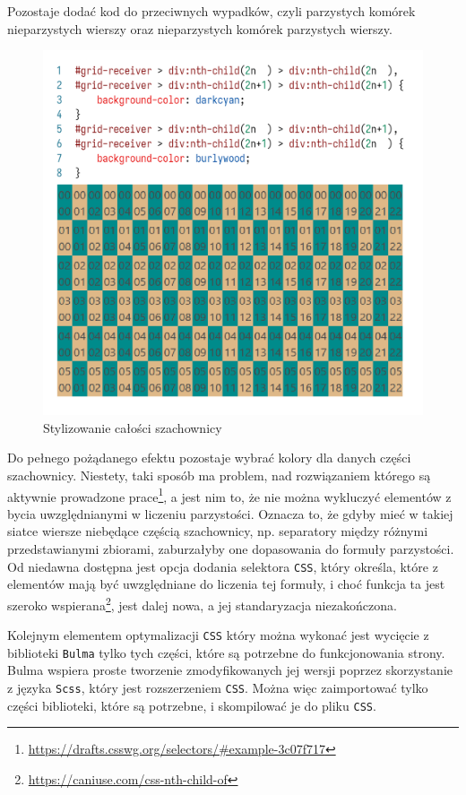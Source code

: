 \documentclass[licencjacka]{pracadypl}
\begin{document}
Pozostaje dodać kod do przeciwnych wypadków, czyli parzystych komórek nieparzystych wierszy oraz nieparzystych komórek parzystych wierszy.

\begin{figure}[H]
  \centering
  \includegraphics[width=\linewidth/\real{2}]{images/codeui-checkerboard-coloring.png}
  \caption{Stylizowanie całości szachownicy}
  \label{fig:codeui-checkerboard-coloring}
\end{figure}

Do pełnego pożądanego efektu pozostaje wybrać kolory dla danych części szachownicy. Niestety, taki sposób ma problem, nad rozwiązaniem którego są aktywnie prowadzone prace\footnote{\url{https://drafts.csswg.org/selectors/\#example-3c07f717}}, a jest nim to, że nie można wykluczyć elementów z bycia uwzględnianymi w liczeniu parzystości. Oznacza to, że gdyby mieć w takiej siatce wiersze niebędące częścią szachownicy, np. separatory między różnymi przedstawianymi zbiorami, zaburzałyby one dopasowania do formuły parzystości. Od niedawna dostępna jest opcja dodania selektora \texttt{CSS}, który określa, które z elementów mają być uwzględniane do liczenia tej formuły, i choć funkcja ta jest szeroko wspierana\footnote{\url{https://caniuse.com/css-nth-child-of}}, jest dalej nowa, a jej standaryzacja niezakończona.

Kolejnym elementem optymalizacji \texttt{CSS} który można wykonać jest wycięcie z biblioteki \texttt{Bulma} tylko tych części, które są potrzebne do funkcjonowania strony. Bulma wspiera proste tworzenie zmodyfikowanych jej wersji poprzez skorzystanie z języka \texttt{Scss}, który jest rozszerzeniem \texttt{CSS}. Można więc zaimportować tylko części biblioteki, które są potrzebne, \linebreak i skompilować je do pliku \texttt{CSS}.
\end{document}
